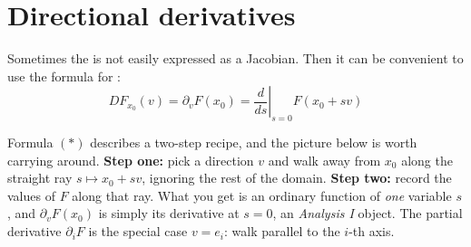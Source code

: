 
\section{Directional derivatives}
\label{sec:directional_derivatives}

Sometimes the   is not easily expressed as a
Jacobian. Then it can be convenient to use the formula for 
:
\begin{equation*}
DF_{x_0}(v) = \partial_v F(x_0) = \left.\frac{d}{ds}\right|_{s=0} F(x_0 + sv) \tag{$*$}
\end{equation*}

Formula $(*)$ describes a two-step recipe, and the picture below is worth carrying around.
\textbf{Step one:} pick a direction $v$ and walk away from $x_0$ along the straight ray
$s \mapsto x_0+sv$, ignoring the rest of the domain. \textbf{Step two:} record the values of $F$
along that ray. What you get is an ordinary function of \emph{one} variable $s$, and
$\partial_vF(x_0)$ is simply its derivative at $s=0$, an \emph{Analysis I} object. The partial
derivative $\partial_iF$ is the special case $v = e_i$: walk parallel to the $i$-th axis.

